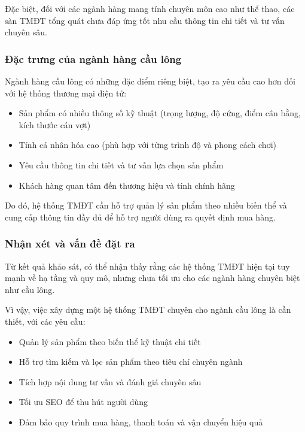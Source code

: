 \documentclass[13pt]{article}
\begin{document}
Đặc biệt, đối với các ngành hàng mang tính chuyên môn cao như thể thao, các sàn TMĐT tổng quát chưa đáp ứng tốt nhu cầu thông tin chi tiết và tư vấn chuyên sâu.

\subsubsection{Đặc trưng của ngành hàng cầu lông}

Ngành hàng cầu lông có những đặc điểm riêng biệt, tạo ra yêu cầu cao hơn đối với hệ thống thương mại điện tử:

\begin{itemize}
    \item Sản phẩm có nhiều thông số kỹ thuật (trọng lượng, độ cứng, điểm cân bằng, kích thước cán vợt)
    \item Tính cá nhân hóa cao (phù hợp với từng trình độ và phong cách chơi)
    \item Yêu cầu thông tin chi tiết và tư vấn lựa chọn sản phẩm
    \item Khách hàng quan tâm đến thương hiệu và tính chính hãng
\end{itemize}

Do đó, hệ thống TMĐT cần hỗ trợ quản lý sản phẩm theo nhiều biến thể và cung cấp thông tin đầy đủ để hỗ trợ người dùng ra quyết định mua hàng.

\subsubsection{Nhận xét và vấn đề đặt ra}

Từ kết quả khảo sát, có thể nhận thấy rằng các hệ thống TMĐT hiện tại tuy mạnh về hạ tầng và quy mô, nhưng chưa tối ưu cho các ngành hàng chuyên biệt như cầu lông.

Vì vậy, việc xây dựng một hệ thống TMĐT chuyên cho ngành cầu lông là cần thiết, với các yêu cầu:

\begin{itemize}
    \item Quản lý sản phẩm theo biến thể kỹ thuật chi tiết
    \item Hỗ trợ tìm kiếm và lọc sản phẩm theo tiêu chí chuyên ngành
    \item Tích hợp nội dung tư vấn và đánh giá chuyên sâu
    \item Tối ưu SEO để thu hút người dùng
    \item Đảm bảo quy trình mua hàng, thanh toán và vận chuyển hiệu quả
\end{itemize}
\end{document}
